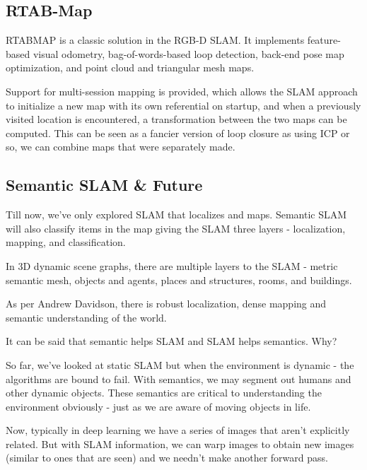 \subsection*{RTAB-Map}

RTABMAP is a classic solution in the RGB-D SLAM. It implements feature-based visual odometry, bag-of-words-based loop detection, back-end pose map optimization, and point cloud and triangular mesh maps. 

Support for multi-session mapping is provided, which allows the SLAM approach to initialize a new map with its own referential on startup, and when a previously visited location is encountered, a transformation between the two maps can be computed. This can be seen as a fancier version of loop closure as using ICP or so, we can combine maps that were separately made.

\subsection*{Semantic SLAM \& Future}

Till now, we've only explored SLAM that localizes and maps. Semantic SLAM will also classify items in the map giving the SLAM three layers - localization, mapping, and classification.

In 3D dynamic scene graphs, there are multiple layers to the SLAM - metric semantic mesh, objects and agents, places and structures, rooms, and buildings.

As per Andrew Davidson, there is robust localization, dense mapping and semantic understanding of the world. 

It can be said that semantic helps SLAM and SLAM helps semantics. Why?

So far, we've looked at static SLAM but when the environment is dynamic - the algorithms are bound to fail. With semantics, we may segment out humans and other dynamic objects. These semantics are critical to understanding the environment obviously - just as we are aware of moving objects in life. 

Now, typically in deep learning we have a series of images that aren't explicitly related. But with SLAM information, we can warp images to obtain new images (similar to ones that are seen) and we needn't make another forward pass.